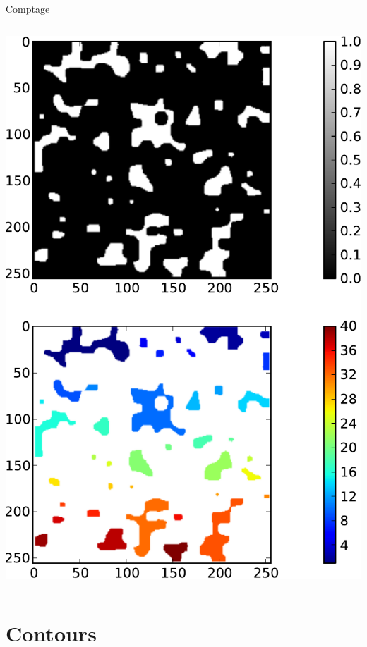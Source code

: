 \documentclass[8pt,a4paper]{beamer}
\begin{document}
\begin{frame}[containsverbatim]{Comptage}
  \begin{columns}
  \includegraphics[width=\textwidth]{figures/comptage.pdf} 
  
    \end{columns}
\end{frame}  

\section{Contours}
\end{document}

